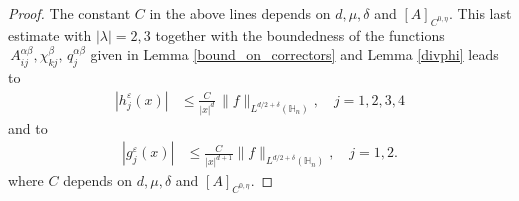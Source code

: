 \documentclass[11pt, reqno]{amsart}
\theoremstyle{definition}
\theoremstyle{remark}
\numberwithin{equation}{section}
\begin{document}
\begin{proof}[Proof]
		The constant $C$ in the above lines depends on $d,\mu, \delta$ and $[A]_{C^{0,\eta}}$.
		This last estimate  with $|\lambda|=2,3$ together with the boundedness of the functions  $\,A^{\alpha\beta}_{ij}, \chi^{\beta}_{kj},\, q^{\alpha\beta}_{j} $ given in Lemma \ref{bound_on_correctors} and Lemma \ref{divphi}    leads to
		\begin{align*}
			|h^\varepsilon_j (x) |&\leq \frac{C}{|x|^{d}}\, 
			\| f\|_{L^{d/2+\delta}(\mathbb{H}_n)}, \quad j=1,2,3,4 
		\end{align*}
		and to 
		\begin{align*}
			|	g^\varepsilon_j (x) |&\leq \frac{C}{|x|^{d+1}}\| f\|_{L^{d/2+\delta}(\mathbb{H}_n)}, \quad j=1,2. 
		\end{align*}  where $C$ depends on $d,\mu, \delta$ and $[A]_{C^{0,\eta}}$.
			\end{proof}
\end{document}
